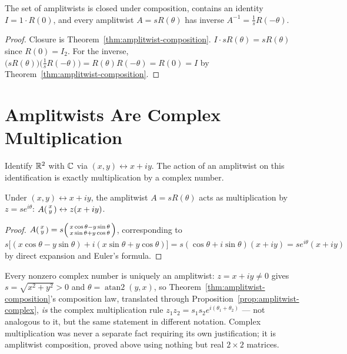 \begin{proposition}
\label{prop:amplitwist-group}
The set of amplitwists is closed under composition, contains an identity
$I = 1\cdot R(0)$, and every amplitwist $A=sR(\theta)$ has inverse $A^{-1} =
\tfrac1s R(-\theta)$.
\end{proposition}

\begin{proof}
Closure is Theorem~\ref{thm:amplitwist-composition}. $I\cdot
sR(\theta)=sR(\theta)$ since $R(0)=I_2$. For the inverse,
$\bigl(sR(\theta)\bigr)\bigl(\tfrac1sR(-\theta)\bigr) =
R(\theta)R(-\theta) = R(0) = I$ by
Theorem~\ref{thm:amplitwist-composition}.
\end{proof}

\section{Amplitwists Are Complex Multiplication}

Identify $\mathbb{R}^2$ with $\mathbb{C}$ via $(x,y) \leftrightarrow x+iy$. The action of an
amplitwist on this identification is exactly multiplication by a complex
number.

\begin{proposition}
\label{prop:amplitwist-complex}
Under $(x,y)\leftrightarrow x+iy$, the amplitwist $A=sR(\theta)$ acts as
multiplication by $z = se^{i\theta}$: $A\begin{psmallmatrix}x\\y
\end{psmallmatrix} \leftrightarrow z(x+iy)$.
\end{proposition}

\begin{proof}
$A\begin{psmallmatrix}x\\y\end{psmallmatrix} =
s\begin{psmallmatrix}x\cos\theta - y\sin\theta\\ x\sin\theta+y\cos\theta
\end{psmallmatrix}$, corresponding to $s\bigl[(x\cos\theta-y\sin\theta) +
i(x\sin\theta+y\cos\theta)\bigr] = s(\cos\theta+i\sin\theta)(x+iy) =
se^{i\theta}(x+iy)$ by direct expansion and Euler's formula.
\end{proof}

Every nonzero complex number is uniquely an amplitwist: $z=x+iy\ne0$ gives
$s=\sqrt{x^2+y^2}>0$ and $\theta=\operatorname{atan2}(y,x)$, so
Theorem~\ref{thm:amplitwist-composition}'s composition law, translated
through Proposition~\ref{prop:amplitwist-complex}, \emph{is} the complex
multiplication rule $z_1z_2 = s_1s_2e^{i(\theta_1+\theta_2)}$ — not
analogous to it, but the same statement in different notation. Complex
multiplication was never a separate fact requiring its own justification;
it is amplitwist composition, proved above using nothing but real
$2\times2$ matrices.

